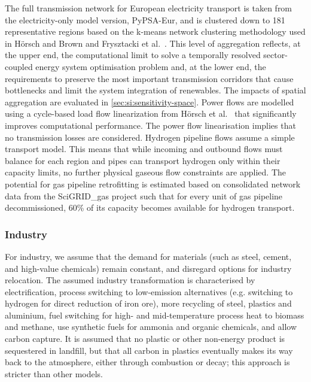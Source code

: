 The full transmission network for European electricity transport is
taken from the electricity-only model version,
PyPSA-Eur,\cite{horschPyPSAEurOpen2018} and is clustered down to 181
representative regions based on the k-means network clustering methodology used
in Hörsch and Brown\cite{Hoersch2017} and Frysztacki et
al.~\cite{frysztackiStrongEffect2021}. This level of aggregation reflects, at
the upper end, the computational limit to solve a temporally resolved
sector-coupled energy system optimisation problem and, at the lower end, the
requirements to preserve the most important transmission corridors that cause
bottlenecks and limit the system integration of renewables. The impacts of
spatial aggregation are evaluated in \cref{sec:si:sensitivity-space}. Power
flows are modelled using a cycle-based load flow linearization from Hörsch et
al.~\cite{horschLinearOptimal2018} that significantly improves computational
performance. The power flow linearisation implies that no transmission losses
are considered. Hydrogen pipeline flows assume a simple transport model. This
means that while incoming and outbound flows must balance for each region and
pipes can transport hydrogen only within their capacity limits, no further
physical gaseous flow constraints are applied. The potential for gas pipeline
retrofitting is estimated based on consolidated network data from the
SciGRID\_gas project \cite{plutaSciGRIDGas2022a} such that for every unit of gas
pipeline decommissioned, 60\% of its capacity becomes available for hydrogen
transport.\cite{gasforclimateEuropeanHydrogen2020}

\subsubsection*{Industry}

For industry, we assume that the demand for materials (such as steel,
cement, and high-value chemicals) remain constant, and disregard options for
industry relocation.\cite{toktarovaInteractionElectrified2022} The assumed
industry transformation is characterised by electrification, process switching
to low-emission alternatives (e.g. switching to hydrogen for direct reduction of
iron ore\cite{voglAssessmentHydrogen2018}), more recycling of steel, plastics
and aluminium\cite{circular_economy}, fuel switching for high- and
mid-temperature process heat to biomass and methane, use synthetic fuels for
ammonia and organic chemicals, and allow carbon capture. It is assumed that no
plastic or other non-energy product is sequestered in landfill, but that all
carbon in plastics eventually makes its way back to the atmosphere, either
through combustion or decay; this approach is stricter than other models.
\cite{in-depth_2018}


